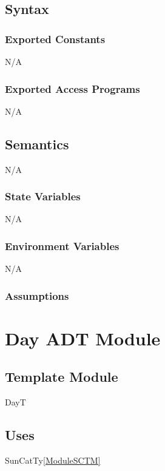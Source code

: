 \documentclass[12pt, titlepage]{article}
\begin{document}
\subsection{Syntax}

\subsubsection{Exported Constants}
N/A\\

\subsubsection{Exported Access Programs}
N/A\\

\subsection{Semantics}
N/A\\
\subsubsection{State Variables}
N/A\\

\subsubsection{Environment Variables}

N/A\\

\subsubsection{Assumptions}

\section{Day ADT Module} \label{ModuleADTD} 

\subsection{Template Module}
DayT

\subsection{Uses}

SunCatTy\ref{ModuleSCTM} \\
\end{document}

